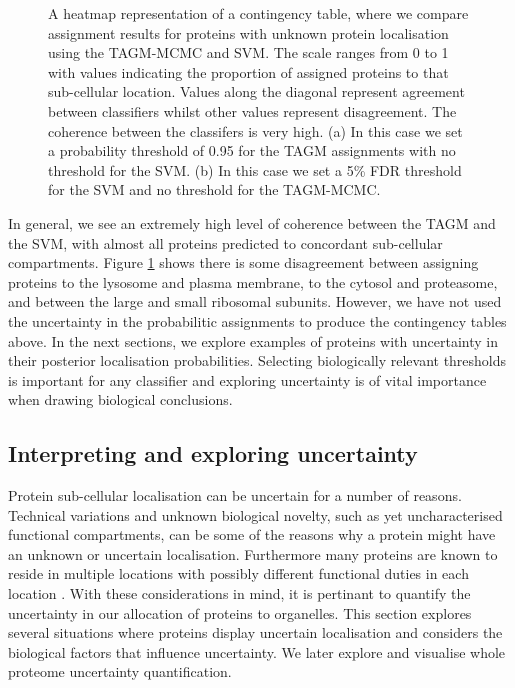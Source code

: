 \documentclass[12pt,english]{article}\usepackage[]{graphicx}\usepackage[]{color}
\newenvironment{knitrout}{}{} %
\begin{document}
\begin{figure}[ht]
\begin{subfigure}[t]{0.5\textwidth}
\begin{knitrout}
\end{knitrout}
\end{subfigure}
\caption{A heatmap representation of a contingency table, where we
  compare assignment results for proteins with unknown protein
  localisation using the TAGM-MCMC and SVM. The scale ranges from 0 to
  1 with values indicating the proportion of assigned proteins to that
  sub-cellular location. Values along the diagonal represent agreement
  between classifiers whilst other values represent disagreement. The
  coherence between the classifers is very high.  (a) In this case we
  set a probability threshold of 0.95 for the TAGM assignments with no
  threshold for the SVM.  (b) In this case we set a 5\% FDR threshold
  for the SVM and no threshold for the TAGM-MCMC.}
\label{figure:contigencytables}
\end{figure}

In general, we see an extremely high level of coherence between the
TAGM and the SVM, with almost all proteins predicted to concordant
sub-cellular compartments. Figure \ref{figure:contigencytables} shows
there is some disagreement between assigning proteins to the lysosome
and plasma membrane, to the cytosol and proteasome, and between the
large and small ribosomal subunits.  However, we have not used the
uncertainty in the probabilitic assignments to produce the contingency
tables above. In the next sections, we explore examples of proteins
with uncertainty in their posterior localisation
probabilities. Selecting biologically relevant thresholds is important
for any classifier and exploring uncertainty is of vital importance
when drawing biological conclusions.


\subsection{Interpreting and exploring uncertainty}

Protein sub-cellular localisation can be uncertain for a number of
reasons. Technical variations and unknown biological novelty, such as
yet uncharacterised functional compartments, can be some of the
reasons why a protein might have an unknown or uncertain
localisation. Furthermore many proteins are known to reside in
multiple locations with possibly different functional duties in each
location \citep{Jeffery:2009}. With these considerations in mind, it is pertinant to
quantify the uncertainty in our allocation of proteins to organelles.
This section explores several situations where proteins display
uncertain localisation and considers the biological factors that
influence uncertainty.  We later explore and visualise whole proteome
uncertainty quantification.
\end{document}
